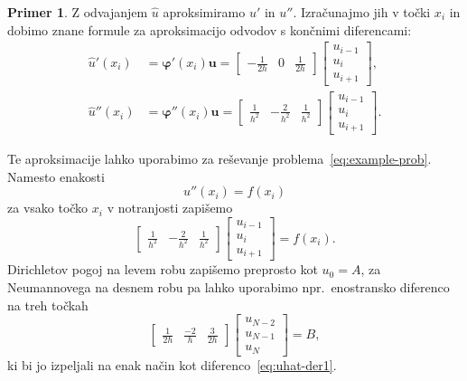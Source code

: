 \documentclass[12pt,a4paper,twoside]{article}
\theoremstyle{definition} %
\newtheorem{primer}[definicija]{Primer}
\theoremstyle{plain} %
\numberwithin{equation}{section}
\renewcommand{\b}{\boldsymbol}
\renewcommand{\phi}{\varphi}
\begin{document}
\begin{primer}
Z odvajanjem $\hat{u}$ aproksimiramo $u'$ in $u''$. Izračunajmo
jih v točki $x_i$ in dobimo znane formule za aproksimacijo odvodov s končnimi diferencami:
\begin{align}
  \hat u'(x_i) &= \b\phi'(x_i) \b u =
  \begin{bmatrix}
    -\frac{1}{2h} & 0 & \frac{1}{2h}
  \end{bmatrix} \begin{bmatrix}
    u_{i-1} \\ u_{i} \\ u_{i+1}
  \end{bmatrix}, \label{eq:uhat-der1} \\
  \hat u''(x_i) &= \b\phi''(x_i) \b u =
  \begin{bmatrix}
    \frac{1}{h^2} & -\frac{2}{h^2} & \frac{1}{h^2}
  \end{bmatrix}\begin{bmatrix}
    u_{i-1} \\ u_{i} \\ u_{i+1}
  \end{bmatrix}.
\end{align}

Te aproksimacije lahko uporabimo za reševanje problema~\eqref{eq:example-prob}.
Namesto enakosti
\begin{equation}
   u''(x_i) = f(x_i)
\end{equation}
za vsako točko $x_i$ v notranjosti zapišemo
\begin{equation}
  \begin{bmatrix}
    \frac{1}{h^2} & -\frac{2}{h^2} & \frac{1}{h^2}
  \end{bmatrix}\begin{bmatrix}
    u_{i-1} \\ u_{i} \\ u_{i+1}
  \end{bmatrix} = f(x_i).
\end{equation}
Dirichletov pogoj na levem robu zapišemo preprosto kot $u_0 = A$,
za Neumannovega na desnem robu pa lahko uporabimo npr.~enostransko diferenco
na treh točkah \[
  \begin{bmatrix}
    \frac{1}{2h} & \frac{-2}{h} & \frac{3}{2h}
  \end{bmatrix}\begin{bmatrix}
    u_{N-2} \\ u_{N-1} \\ u_{N}
  \end{bmatrix} = B,
\]
ki bi jo izpeljali na enak način kot diferenco~\eqref{eq:uhat-der1}.


\end{primer}
\end{document}
